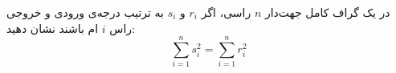 \EXERCISE
در یک گراف کامل جهت‌دار
$n$
راسی، اگر
$r_i$
و
$s_i$
به ترتیب درجه‌ی ورودی و خروجی راس
$i$
ام باشند نشان دهید:
$$\sum_{i=1}^{n}s_i^2 = \sum_{i=1}^{n}r_i^2$$